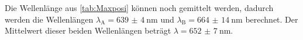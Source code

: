 Die Wellenlänge aus \ref{tab:Maxposi} können noch gemittelt werden, dadurch werden die Wellenlängen $\lambda_{\text{A}}=\SI{639(4)}{\nano\meter}$ und
$\lambda_{\text{B}}=\SI{664(14)}{\nano\meter}$ berechnet. Der Mittelwert dieser beiden Wellenlängen beträgt $\lambda=\SI{652(7)}{\nano\meter}$.
\newpage